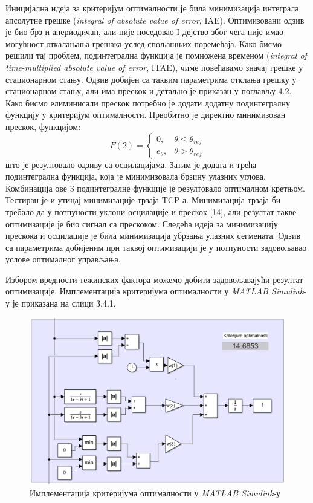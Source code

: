 \documentclass[12pt]{article}
\begin{document}
Иницијална идеја за критеријум оптималности је била минимизација интеграла апсолутне грешке (\textit{integral of absolute value of error}, IAE). Оптимизовани одзив је био брз и апериодичан, али није поседовао I дејство због чега није имао могућност откалањања грешака услед спољашњих поремећаја. Како бисмо решили тај проблем, подинтегрална функција је помножена временом (\textit{integral of time-multiplied absolute value of error}, ITAE), чиме повећавамо значај грешке у стационарном стању. Одзив добијен са таквим параметрима отклања грешку у стационарном стању, али има прескок и детаљно је приказан у поглављу 4.2. Како бисмо елиминисали прескок потребно је додати додатну подинтегралну функцију у критеријум оптималности. Првобитно је директно минимизован прескок, функцијом:
\[
F(2) = 
\begin{cases} 
0, & \theta \leq \theta_{ref} \\
e_{\theta}, & \theta > \theta_{ref}
\end{cases}
\]
што је резултовало одзиву са осцилацијама. Затим је додата и трећа подинтегрална функција, која је минимизовала брзину улазних углова. Комбинација ове 3 подинтегралне функције је резултовало оптималном кретњом. Тестиран је и утицај минимизације трзаја TCP-а. Минимизација трзаја би требало да у потпуности уклони осцилације и прескок [14], али резултат такве оптимизације је био сигнал са прескоком. Следећа идеја за минимизацију прескока и осцилације је била минимизација убрзања улазних сегмената. Одзив са параметрима добијеним при таквој оптимизацији је у потпуности задовољавао услове оптималног управљања.

Избором вредности тежинских фактора можемо добити задовољавајући резултат оптимизације. Имплементација критеријума оптималности у \textit{MATLAB Simulink}-у је приказана на слици 3.4.1.
\begin{figure}[H]
    \centering
    \includegraphics[width=17.5cm]{figures/krit_opti.jpg}
    \caption{Имплементација критеријума оптималности у \textit{MATLAB Simulink}-у}
    \label{fig:kriterijum_optimalnosti}
\end{figure}
\end{document}
